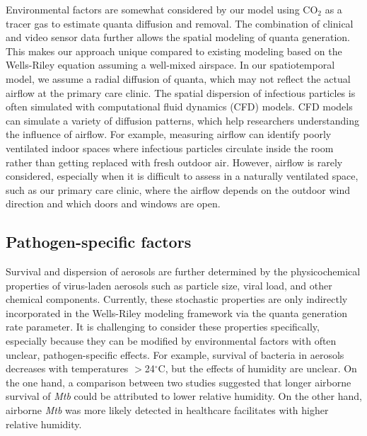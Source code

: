\documentclass[fleqn,11pt]{wlscirep_supp}
\begin{document}
Environmental factors are somewhat considered by our model using CO$_2$ as a tracer gas to estimate quanta diffusion and removal. The combination of clinical and video sensor data further allows the spatial modeling of quanta generation. This makes our approach unique compared to existing modeling based on the Wells-Riley equation assuming a well-mixed airspace\cite{Riley1978AJE,Rudnick2003IndoorAir}. In our spatiotemporal model, we assume a radial diffusion of quanta, which may not reflect the actual airflow at the primary care clinic. The spatial dispersion of infectious particles is often simulated with computational fluid dynamics (CFD) models\cite{Vuorinen2020SafSci,Jung2021InfectChemo,Li2021BuildEnv}. CFD models can simulate a variety of diffusion patterns, which help researchers understanding the influence of airflow. For example, measuring airflow can identify poorly ventilated indoor spaces where infectious particles circulate inside the room rather than getting replaced with fresh outdoor air\cite{Li2021BuildEnv}. However, airflow is rarely considered, especially when it is difficult to assess in a naturally ventilated space, such as our primary care clinic, where the airflow depends on the outdoor wind direction and which doors and windows are open. 

\subsection{Pathogen-specific factors}

Survival and dispersion of aerosols are further determined by the physicochemical properties of virus-laden aerosols such as particle size, viral load, and other chemical components\cite{Wang2021Science}. Currently, these stochastic properties are only indirectly incorporated in the Wells-Riley modeling framework via the quanta generation rate parameter\cite{Riley1978AJE,Rudnick2003IndoorAir}. It is challenging to consider these properties specifically, especially because they can be modified by environmental factors with often unclear, pathogen-specific effects\cite{Songer1967,Chan2011AdvVir,Fernstrom2013JoP,Cox1995Book,Fernstrom2013JoP,Tang2009Interface}. For example, survival of bacteria in aerosols decreases with temperatures $>$24$^{\circ}$C, but the effects of humidity are unclear\cite{Tang2009Interface}. On the one hand, a comparison between two studies suggested that longer airborne survival of \emph{Mtb} could be attributed to lower relative humidity\cite{Loudon1969AMRRD,Lever2000LettersAppliedMicrobio}. On the other hand, airborne \emph{Mtb} was more likely detected in healthcare facilitates with higher relative humidity\cite{Sornboot2019IJTLD,Matuka2021IJERP}.   
\end{document}
